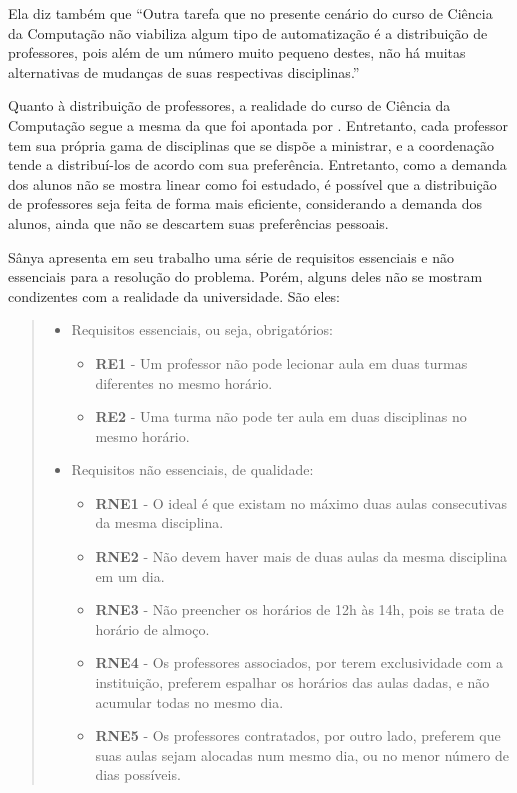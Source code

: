 Ela diz também que ``Outra tarefa que no presente cenário do curso de Ciência da Computação não viabiliza algum tipo de automatização é a distribuição de professores, pois além de um número muito pequeno destes, não há muitas alternativas de mudanças de suas respectivas disciplinas.''

Quanto à distribuição de professores, a realidade do curso de Ciência da Computação segue a mesma da que foi apontada por . Entretanto, cada professor tem sua própria gama de disciplinas que se dispõe a ministrar, e a coordenação tende a distribuí-los de acordo com sua preferência. Entretanto, como a demanda dos alunos não se mostra linear como foi estudado, é possível que a distribuição de professores seja feita de forma mais eficiente, considerando a demanda dos alunos, ainda que não se descartem suas preferências pessoais.

Sânya apresenta em seu trabalho uma série de requisitos essenciais e não essenciais para a resolução do problema. Porém, alguns deles não se mostram condizentes com a realidade da universidade. São eles:

\begin{quote}\footnotesize
  \begin{itemize}
    \item Requisitos essenciais, ou seja, obrigatórios:
          \begin{itemize}
            \item \textbf{RE1} - Um professor não pode lecionar aula em duas turmas diferentes no mesmo horário.
            \item \textbf{RE2} - Uma turma não pode ter aula em duas disciplinas no mesmo horário.
          \end{itemize}
    \item Requisitos não essenciais, de qualidade:
          \begin{itemize}
            \item \textbf{RNE1} - O ideal é que existam no máximo duas aulas consecutivas da mesma disciplina.
            \item \textbf{RNE2} - Não devem haver mais de duas aulas da mesma disciplina em um dia.
            \item \textbf{RNE3} - Não preencher os horários de 12h às 14h, pois se trata de horário de almoço.
            \item \textbf{RNE4} - Os professores associados, por terem exclusividade com a instituição, preferem espalhar os horários das aulas dadas, e não acumular todas no mesmo dia.
            \item \textbf{RNE5} - Os professores contratados, por outro lado, preferem que suas aulas sejam alocadas num mesmo dia, ou no menor número de dias possíveis.
          \end{itemize}
  \end{itemize}
\end{quote}

